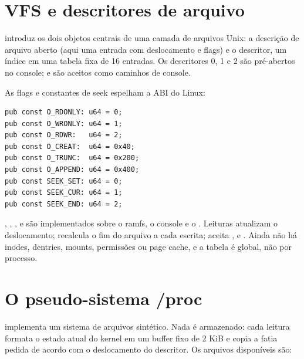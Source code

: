 \section{VFS e descritores de arquivo}

 introduz os dois objetos centrais de uma camada de arquivos
Unix: a descri\c{c}\~ao de arquivo aberto (aqui uma entrada com deslocamento e
flags) e o descritor, um \'indice em uma tabela fixa de 16 entradas. Os
descritores 0, 1 e 2 s\~ao pr\'e-abertos no console;  e
 s\~ao aceitos como caminhos de console.

As flags e constantes de seek espelham a ABI do Linux:

\begin{lstlisting}[caption={Subconjunto das constantes do VFS.},label={lst:vfsflagspt}]
pub const O_RDONLY: u64 = 0;
pub const O_WRONLY: u64 = 1;
pub const O_RDWR:   u64 = 2;
pub const O_CREAT:  u64 = 0x40;
pub const O_TRUNC:  u64 = 0x200;
pub const O_APPEND: u64 = 0x400;
pub const SEEK_SET: u64 = 0;
pub const SEEK_CUR: u64 = 1;
pub const SEEK_END: u64 = 2;
\end{lstlisting}

, , ,  e  s\~ao
implementados sobre o ramfs, o console e o . Leituras atualizam o
deslocamento;  recalcula o fim do arquivo a cada escrita;
 aceita ,  e .
Ainda n\~ao h\'a inodes, dentries, mounts, permiss\~oes ou page cache, e a
tabela \'e global, n\~ao por processo.

\section{O pseudo-sistema /proc}

 implementa um sistema de arquivos sint\'etico. Nada \'e
armazenado: cada leitura formata o estado atual do kernel em um buffer fixo de
2 KiB e copia a fatia pedida de acordo com o deslocamento do descritor. Os
arquivos dispon\'iveis s\~ao:

